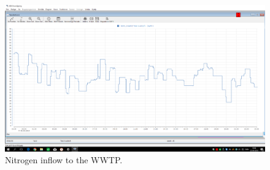 \begin{figure}[H]
	\centering
	\includegraphics[width=0.95\textheight, angle=-90]{report/appendix/figures/kvaelstof_data.png}
	\caption{Nitrogen inflow to the WWTP.}
	\label{fig:kvaelstof_data}
\end{figure}